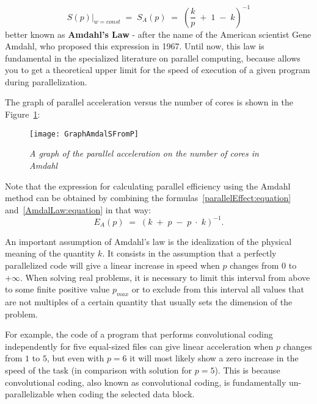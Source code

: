 {	\begin{equation}
		\label{AmdalLaw:equation}
		\left.S(p)\right|_{w=const}\;=\;S_A(p)\;=\;\left(\frac kp\;+\;1\;-\;k\right)^{-1}
	\end{equation}
	better known as \textbf{Amdahl’s Law} - after the name of the American scientist Gene Amdahl, who proposed this expression in 1967. Until now, this law is fundamental in the specialized literature on parallel computing, because allows you to get a theoretical upper limit for the speed of execution of a given program during parallelization.
	\par The graph of parallel acceleration versus the number of cores is shown in the Figure~\ref{GraphAmdalSFromP:image}:
	\begin{figure}[H]
		\texttt{[image: GraphAmdalSFromP]}
		\caption{\textit{A graph of the parallel acceleration on the number of cores in Amdahl}}
		\label{GraphAmdalSFromP:image}
	\end{figure}
	\par Note that the expression for calculating parallel efficiency using the Amdahl method can be obtained by combining the formulas~\eqref{parallelEffect:equation} and~\eqref{AmdalLaw:equation} in that way:
	\begin{equation}
		E_A(p)\;=\;\left(k\;+\;p\;-\;p\;\cdot\;k\right)^{-1}.
	\end{equation}
	\par An important assumption of Amdahl's law is the idealization of the physical meaning of the quantity $k$. It consists in the assumption that a perfectly parallelized code will give a linear increase in speed when $ p $ changes from $0$ to $+\infty$. When solving real problems, it is necessary to limit this interval from above to some finite positive value $p_{max}$ or to exclude from this interval all values that are not multiples of a certain quantity that usually sets the dimension of the problem.
	\par For example, the code of a program that performs convolutional coding independently for five equal-sized files can give linear acceleration when $p$ changes from $1$ to $5$, but even with $p = 6$ it will most likely show a zero increase in the speed of the task (in comparison with solution for $p = 5$). This is because convolutional coding, also known as convolutional coding, is fundamentally un-parallelizable when coding the selected data block.
	\par
}